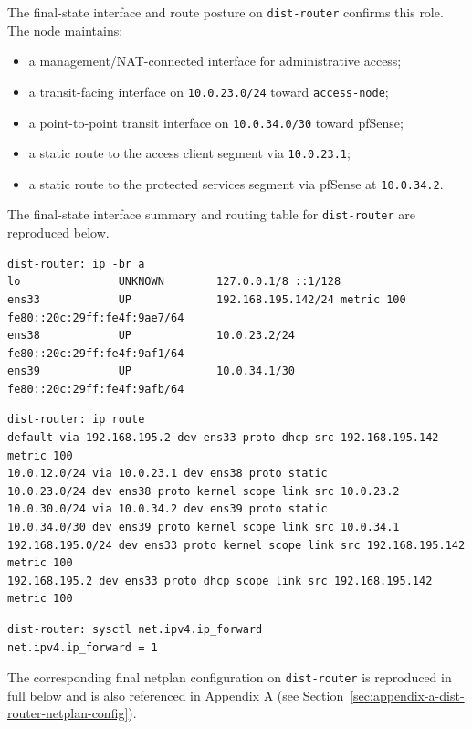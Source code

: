 \documentclass[11pt]{article}
\begin{document}
The final-state interface and route posture on \texttt{dist-router} confirms this role. The node maintains:

\begin{itemize}
    \item a management/NAT-connected interface for administrative access;
    \item a transit-facing interface on \texttt{10.0.23.0/24} toward \texttt{access-node};
    \item a point-to-point transit interface on \texttt{10.0.34.0/30} toward pfSense;
    \item a static route to the access client segment via \texttt{10.0.23.1};
    \item a static route to the protected services segment via pfSense at \texttt{10.0.34.2}.
\end{itemize}

The final-state interface summary and routing table for \texttt{dist-router} are reproduced below.

\begin{verbatim}
dist-router: ip -br a
lo               UNKNOWN        127.0.0.1/8 ::1/128
ens33            UP             192.168.195.142/24 metric 100 fe80::20c:29ff:fe4f:9ae7/64
ens38            UP             10.0.23.2/24 fe80::20c:29ff:fe4f:9af1/64
ens39            UP             10.0.34.1/30 fe80::20c:29ff:fe4f:9afb/64
\end{verbatim}

\begin{verbatim}
dist-router: ip route
default via 192.168.195.2 dev ens33 proto dhcp src 192.168.195.142 metric 100
10.0.12.0/24 via 10.0.23.1 dev ens38 proto static
10.0.23.0/24 dev ens38 proto kernel scope link src 10.0.23.2
10.0.30.0/24 via 10.0.34.2 dev ens39 proto static
10.0.34.0/30 dev ens39 proto kernel scope link src 10.0.34.1
192.168.195.0/24 dev ens33 proto kernel scope link src 192.168.195.142 metric 100
192.168.195.2 dev ens33 proto dhcp scope link src 192.168.195.142 metric 100
\end{verbatim}

\begin{verbatim}
dist-router: sysctl net.ipv4.ip_forward
net.ipv4.ip_forward = 1
\end{verbatim}

The corresponding final netplan configuration on \texttt{dist-router} is reproduced in full below and is also referenced in Appendix A (see Section~\ref{sec:appendix-a-dist-router-netplan-config}).
\end{document}
